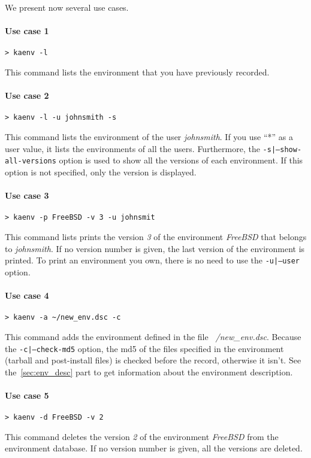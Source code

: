 \documentclass[a4wide,10pt,oneside]{book}
\begin{document}
We present now several use cases.
\paragraph{Use case 1}
\begin{verbatim}
> kaenv -l
\end{verbatim}
This command lists the environment that you have previously recorded.

\paragraph{Use case 2}
\begin{verbatim}
> kaenv -l -u johnsmith -s
\end{verbatim}
This command lists the environment of the user \textit{johnsmith}. If you use ``*'' as a user value, it lists the environments of all the users. Furthermore, the \texttt{-s|--show-all-versions} option is used to show all the versions of each environment. If this option is not specified, only the version is displayed.

\paragraph{Use case 3}
\begin{verbatim}
> kaenv -p FreeBSD -v 3 -u johnsmit
\end{verbatim}
This command lists prints the version \textit{3} of the environment \textit{FreeBSD} that belongs to \textit{johnsmith}. If no version number is given, the last version of the environment is printed. To print an environment you own, there is no need to use the \texttt{-u|--user} option.

\paragraph{Use case 4}
\begin{verbatim}
> kaenv -a ~/new_env.dsc -c
\end{verbatim}
This command adds the environment defined in the file \textit{~/new\_env.dsc}. Because the \texttt{-c|--check-md5} option, the md5 of the files specified in the environment (tarball and post-install files) is checked before the record, otherwise it isn't. See the~\ref{sec:env_desc} part to get information about the environment description.

\paragraph{Use case 5}
\begin{verbatim}
> kaenv -d FreeBSD -v 2
\end{verbatim}
This command deletes the version \textit{2} of the environment \textit{FreeBSD} from the environment database. If no version number is given, all the versions are deleted.
\end{document}
